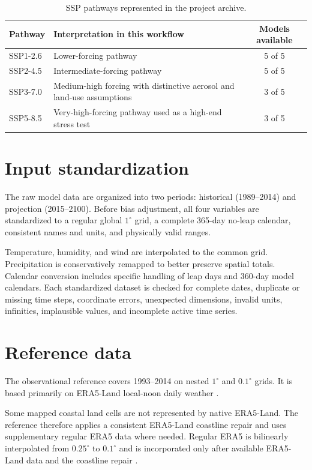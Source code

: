 \documentclass[11pt]{article}
\begin{document}
\begin{table}[htbp]
\centering
\caption{SSP pathways represented in the project archive.}
\label{tab:ssps}
\small
\begin{tabularx}{\textwidth}{lXc}
\toprule
Pathway & Interpretation in this workflow & Models available \\
\midrule
SSP1-2.6 & Lower-forcing pathway & 5 of 5 \\
SSP2-4.5 & Intermediate-forcing pathway & 5 of 5 \\
SSP3-7.0 & Medium-high forcing with distinctive aerosol and land-use assumptions & 3 of 5 \\
SSP5-8.5 & Very-high-forcing pathway used as a high-end stress test & 3 of 5 \\
\bottomrule
\end{tabularx}
\end{table}

\section{Input standardization}

The raw model data are organized into two periods: historical (1989--2014) and
projection (2015--2100). Before bias adjustment, all four variables are
standardized to a regular global $1^{\circ}$ grid, a complete 365-day no-leap
calendar, consistent names and units, and physically valid ranges.

Temperature, humidity, and wind are interpolated to the common grid.
Precipitation is conservatively remapped to better preserve spatial totals.
Calendar conversion includes specific handling of leap days and 360-day model
calendars. Each standardized dataset is checked for complete dates, duplicate
or missing time steps, coordinate errors, unexpected dimensions, invalid
units, infinities, implausible values, and incomplete active time series.

\section{Reference data}

The observational reference covers 1993--2014 on nested $1^{\circ}$ and
$0.1^{\circ}$ grids. It is based primarily on ERA5-Land local-noon daily
weather \cite{munoz2021}.

Some mapped coastal land cells are not represented by native ERA5-Land. The
reference therefore applies a consistent ERA5-Land coastline repair and uses
supplementary regular ERA5 data where needed. Regular ERA5 is bilinearly
interpolated from $0.25^{\circ}$ to $0.1^{\circ}$ and is incorporated only
after available ERA5-Land data and the coastline repair \cite{hersbach2020}.
\end{document}
